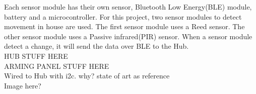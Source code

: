 Each sensor module has their own sensor, Bluetooth Low Energy(BLE) module, battery and a microcontroller. For this project, two sensor modules to detect movement in house are used. The first sensor module uses a Reed sensor. The other sensor module uses a Passive infrared(PIR) sensor. 
When a sensor module detect a change, it will send the data over BLE to the Hub.\\
HUB STUFF HERE \\
ARMING PANEL STUFF HERE \\
Wired to Hub with i2c. why? state of art as reference\\
Image here? 